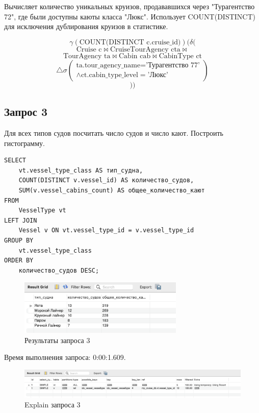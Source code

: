 \documentclass[11pt,a4paper,final]{article}
\begin{document}
Вычисляет количество уникальных круизов, продававшихся через "Турагентство 72", где были доступны каюты класса "Люкс". Использует \newline 
COUNT(DISTINCT) для исключения дублирования круизов в статистике.

$$
\gamma(\text{COUNT(DISTINCT c.cruise\_id)})(\delta(
$$
$$
\text{Cruise c} \bowtie \text{CruiseTourAgency cta} \bowtie
$$
$$
\text{TourAgency ta} \bowtie \text{Cabin cab} \bowtie \text{CabinType ct}
$$
$$
\triangle \sigma\begin{pmatrix}
\text{ta.tour\_agency\_name} = \text{'Турагентство 77'} \\
\wedge \text{ct.cabin\_type\_level} = \text{'Люкс'}
\end{pmatrix}
$$
$$))$$

\subsection{Запрос 3}
Для всех типов судов посчитать число судов и число кают. Построить гистограмму.

\begin{lstlisting}[style=sqlstyle, label=sql:query1]
SELECT
    vt.vessel_type_class AS тип_судна,
    COUNT(DISTINCT v.vessel_id) AS количество_судов,
    SUM(v.vessel_cabins_count) AS общее_количество_кают
FROM
    VesselType vt
LEFT JOIN
    Vessel v ON vt.vessel_type_id = v.vessel_type_id
GROUP BY
    vt.vessel_type_class
ORDER BY
    количество_судов DESC;
\end{lstlisting}
\begin{figure}[h!]
    \centering
    \includegraphics[width=0.7\textwidth]{14.png} 
    \caption{Результаты запроса 3}
\end{figure}
{\centering
Время выполнения запроса: 0:00:1.609.\par}
\begin{figure}[H]
    \centering
    \includegraphics[width=\textwidth]{15.png} 
    \caption{Explain запроса 3}
\end{figure}
\end{document}
